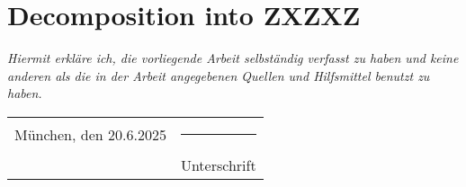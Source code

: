\documentclass[12pt,twoside]{report}  %
\begin{document}
\appendix

\chapter{Decomposition into ZXZXZ}

\newpage


\emph{Hiermit erkläre ich, die vorliegende Arbeit selbständig verfasst zu haben und keine anderen als die in der Arbeit angegebenen Quellen und Hilfsmittel benutzt zu haben.}

\vspace{2cm}  
\noindent
\begin{tabular}{p{7cm} p{7cm}}
    München, den 20.6.2025 & \rule{6cm}{0.4pt} \\  
    & Unterschrift
\end{tabular}
\end{document}
